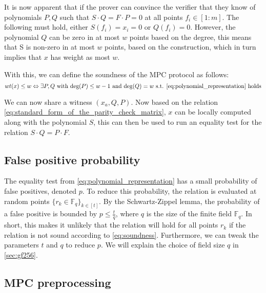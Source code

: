 \documentclass[twoside,11pt,openright]{report}
\theoremstyle{definition}
\theoremstyle{plain}
\begin{document}
It is now apparent that if the prover can convince the verifier that they know of polynomials $P,Q$ such that $S\cdot Q = F \cdot P = 0$ at all points $f_i \in [1:m]$. The following must hold, either $S(f_i) = x_i = 0$ or $Q(f_i) = 0$. However, the polynomial $Q$ can be zero in at most $w$ points based on the degree, this means that S is non-zero in at most $w$ points, based on the construction, which in turn implies that $x$ has weight as most $w$.

With this, we can define the soundness of the MPC protocol as follows:
\begin{equation}
  wt(x) \leq w \Leftrightarrow \exists P,Q \text{  with  }\text{deg}(P)\leq w-1\text{  and  }\text{deg}(Q) = w\text{ s.t. \autoref{eq:polynomial_representation} holds}
  \label{eq:soundness}
\end{equation}

We can now share a witness $(x_a, Q, P)$. Now based on the relation \autoref{eq:standard_form_of_the_parity_check_matrix}, $x$ can be locally computed along with the polynomial $S$, this can then be used to run an equality test for the relation $S \cdot Q = P \cdot F$.

\subsection{False positive probability}\label{sub:equality_test}
The equality test from \autoref{eq:polynomial_representation} has a small probability of false positives, denoted $p$. To reduce this probability, the relation is evaluated at random points $\{r_k \in \mathbb{F}_q\}_{k\in[t]}$. By the Schwartz-Zippel lemma, the probability of a false positive is bounded by $p \leq \frac{t}{q}$, where $q$ is the size of the finite field $\mathbb{F}_q$. In short, this makes it unlikely that the relation will hold for all points $r_k$ if the relation is not sound according to \autoref{eq:soundness}. Furthermore, we can tweak the parameters $t$ and $q$ to reduce $p$. We will explain the choice of field size $q$ in \autoref{sec:gf256}.


\subsection{MPC preprocessing}
\end{document}
